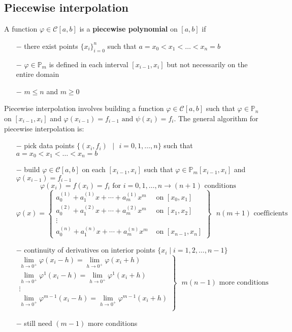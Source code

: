 \documentclass[11pt]{article}
\theoremstyle{definition}
\let\phi\varphi
\newcommand{\PP}{\mathbb{P}}
\newcommand{\C}{\mathcal{C}}
\begin{document}
\subsection{Piecewise interpolation}
A function $\phi\in\C[a,b]$ is a \textbf{piecewise polynomial} on $[a,b]$ if
\vspace{-3mm}
\begin{itemize}
\itemsep0em
	\item[$-$] there exist points $\{x_i\}_{i=0}^n$ such that $a=x_0<x_1<\dots<x_n=b$
	\item[$-$] $\phi\in\PP_m$ is defined in each interval $[x_{i-1},x_i]$ but not necessarily on the entire domain 
	\item[$-$] $m\leqslant n$ and $m\geqslant 0$
\end{itemize}
\vspace{-2mm}
Piecewise interpolation involves building a function $\phi\in\C[a,b]$ such that $\phi\in\PP_n$ on $[x_{i-1},x_i]$ and $\phi(x_{i-1})=f_{i-1}\text{ and }\psi(x_i)=f_i$. The general algorithm for piecewise interpolation is:
\vspace{-3mm}
\begin{itemize}
\itemsep0em
	\item[$-$] pick data points $\{(x_i,f_i)\text{ }|\text{ }i=0,1,\dots,n\}$ such that $a=x_0<x_1<\dots<x_n=b$
	\item[$-$] build $\phi\in\C[a,b]$ on each $[x_{i-1},x_i]$ such that $\phi\in\PP_m[x_{i-1},x_i]$ and $\phi(x_{i-1})=f_{i-1}$
	$$\phi(x_i)=f(x_i)=f_i\text{ for }i=0,1,\dots,n\rightarrow(n+1)\text{ conditions}$$
	$$\phi(x)=\left\lbrace\begin{array}{rl}
		a_0^{(1)}+a_1^{(1)}x+\cdots+a_m^{(1)}x^m & \text{ on }[x_0,x_1]\\
		a_0^{(2)}+a_1^{(2)}x+\cdots+a_m^{(2)}x^m & \text{ on }[x_1,x_2]\\
		\vdots & \\
		a_0^{(n)}+a_1^{(n)}x+\cdots+a_m^{(n)}x^m & \text{ on }[x_{n-1},x_n]
	\end{array}\right\rbrace\text{ }n(m+1)\text{ coefficients}$$
	\item[$-$] continuity of derivatives on interior points $\{x_i\mid i=1,2,\dots,n-1\}$
	$$\left.\begin{array}{c}
	\displaystyle\lim_{h\to 0^{+}}\phi(x_i-h)=\lim_{h\to 0^{+}}\phi(x_i+h)\\
	\displaystyle\lim_{h\to 0^{+}}\phi^1(x_i-h)=\lim_{h\to 0^{+}}\phi^1(x_i+h)\\
	\vdots\\
	\displaystyle\lim_{h\to 0^{+}}\phi^{m-1}(x_i-h)=\lim_{h\to 0^{+}}\phi^{m-1}(x_i+h)\\
	\end{array}\right\rbrace\text{ }m(n-1)\text{ more conditions}$$
	\item[$-$] still need $(m-1)$ more conditions
\end{itemize}
\end{document}
